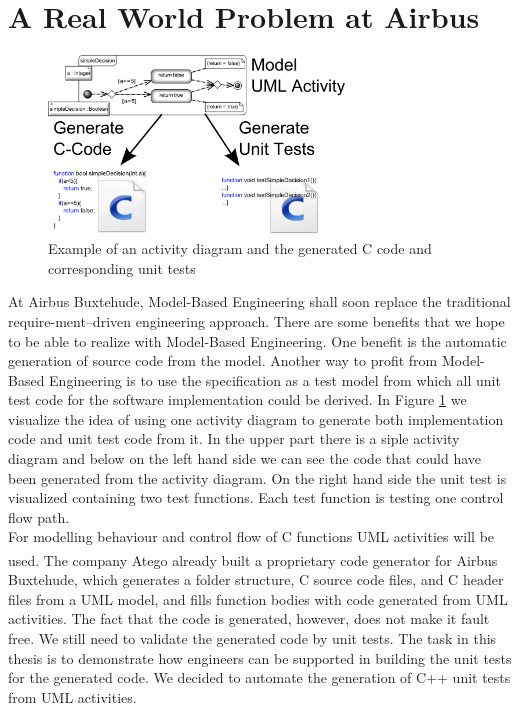 \section{A Real World Problem at Airbus}
\begin{figure}
\label{fig:Act2Code+Tests}
\includegraphics[width=0.7\textwidth]{./pics/Activity2Code+Tests.png}
\caption{Example of an activity diagram and the generated C code and corresponding unit tests}
\end{figure}
At Airbus Buxtehude, Model-Based Engineering shall soon replace the traditional require-ment--driven engineering approach. There are some benefits that we hope to be able to realize with Model-Based Engineering. One benefit is the automatic generation of source code from the model. Another way to profit from Model-Based Engineering is to use the specification as a test model from which all unit test code for the software implementation could be derived. In Figure \ref{fig:Act2Code+Tests} we visualize the idea of using one activity diagram to generate both implementation code and unit test code from it. In the upper part there is a siple activity diagram and below on the left hand side we can see the code that could have been generated from the activity diagram. On the right hand side the unit test is visualized containing two test functions. Each test function is testing one control flow path. \\
For modelling behaviour and control flow of C functions UML activities will be used. The company Atego\textsuperscript{\textregistered} already built a proprietary code generator for Airbus Buxtehude, which generates a folder structure, C source code files, and C header files from a UML model, and fills function bodies with code generated from UML activities. The fact that the code is generated, however, does not make it fault free. We still need to validate the generated code by unit tests. The task in this thesis is to demonstrate how engineers can be supported in building the unit tests for the generated code. We decided to automate the generation of C++ unit tests from UML activities.\\

